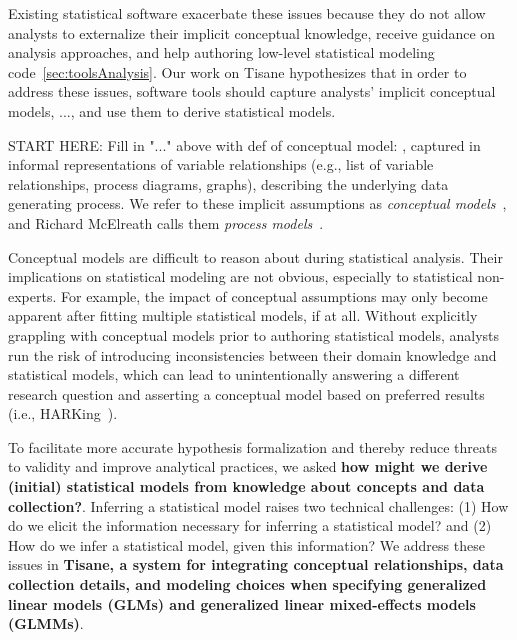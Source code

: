 Existing statistical software exacerbate these issues because they do not allow
analysts to externalize their implicit conceptual knowledge, receive guidance on
analysis approaches, and help authoring low-level statistical modeling
code~\autoref{sec:toolsAnalysis}. Our work on Tisane hypothesizes that in order
to address these issues, software tools should capture analysts' implicit
conceptual models, ..., and use them to derive statistical models. 

START HERE: Fill in "..." above with def of conceptual model:
, captured in informal
representations of variable relationships (e.g., list of variable relationships,
process diagrams, graphs), describing the underlying data generating process. We
refer to these implicit assumptions as \textit{conceptual
models}~\cite{jun2021hypothesisFormalization}, and Richard McElreath calls them
\textit{process models}~\cite{mcelreath2020statistical}.

Conceptual models are difficult to reason about during
statistical analysis. Their implications on statistical modeling are not
obvious, especially to statistical non-experts. For example, the impact of
conceptual assumptions may only become apparent after fitting multiple
statistical models, if at all. Without explicitly grappling with conceptual
models prior to authoring statistical models, analysts run the risk of
introducing inconsistencies between their domain knowledge and statistical
models, which can lead to unintentionally answering a different research
question and asserting a conceptual model based on preferred results (i.e.,
HARKing~\cite{}). 

To facilitate more accurate
hypothesis formalization and thereby reduce threats to validity and improve
analytical practices, we asked \textbf{how might we derive (initial) statistical
models from knowledge about concepts and data collection?}. Inferring a statistical model raises two
technical challenges: (1) How do we elicit the information necessary for
inferring a statistical model? and (2) How do we infer a statistical model,
given this information? We address these issues in \textbf{Tisane, a system for integrating
conceptual relationships, data collection details, and modeling choices when
specifying generalized linear models (GLMs) and generalized linear mixed-effects
models (GLMMs)}. 

